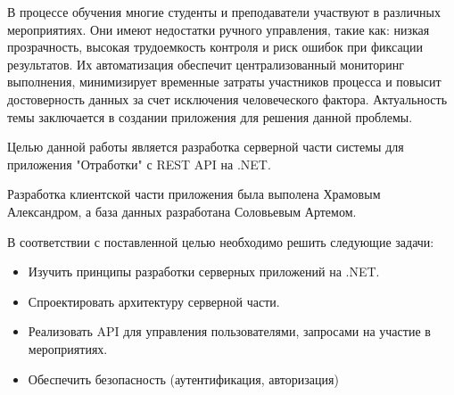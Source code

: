 \intro

В процессе обучения многие студенты и преподаватели участвуют в различных мероприятиях. Они имеют недостатки ручного управления, такие как: низкая прозрачность, высокая трудоемкость контроля и риск ошибок при фиксации результатов. Их автоматизация обеспечит централизованный мониторинг выполнения, минимизирует временные затраты участников процесса и повысит достоверность данных за счет исключения человеческого фактора. Актуальность темы заключается в создании приложения для решения данной проблемы.

Целью данной работы является разработка серверной части системы для приложения "Отработки" с REST API на .NET.

Разработка клиентской части приложения была выполена Храмовым Александром, а база данных разработана Соловьевым Артемом.

В соответствии с поставленной целью необходимо решить следующие задачи:
\begin{itemize}
	\item{Изучить принципы разработки серверных приложений на .NET.}
	\item{Спроектировать архитектуру серверной части.}
	\item{Реализовать API для управления пользователями, запросами на участие в мероприятиях.}
	\item{Обеспечить безопасность (аутентификация, авторизация)}
\end{itemize}

